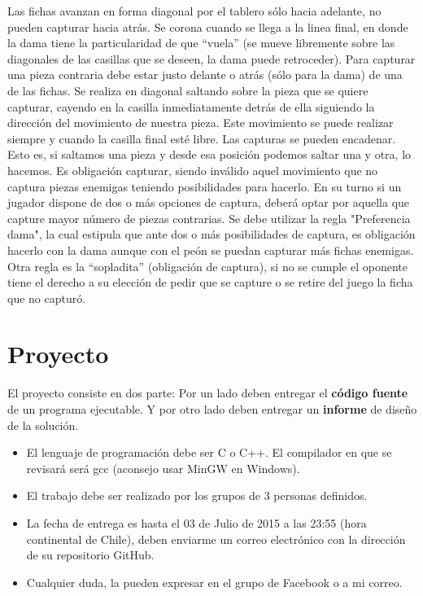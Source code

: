 \documentclass[a4paper,10pt]{article}
\begin{document}
Las fichas avanzan en forma diagonal por el tablero sólo hacia adelante, no pueden capturar hacia atrás. Se corona cuando se llega a la linea final, en donde  la dama tiene la particularidad de que ``vuela'' (se mueve libremente sobre las diagonales de las casillas que se deseen, la dama puede retroceder).
\newline
Para capturar una pieza contraria debe estar justo delante o atrás (sólo para la dama) de una de las fichas. Se realiza en diagonal saltando sobre la pieza que se quiere capturar, cayendo en la casilla inmediatamente detrás de ella siguiendo la dirección del movimiento de nuestra pieza. Este movimiento se puede realizar siempre y cuando la casilla final esté libre. Las capturas se pueden encadenar. Esto es, si saltamos una pieza y desde esa posición podemos saltar una y otra, lo hacemos. Es obligación capturar, siendo inválido aquel movimiento que no captura piezas enemigas teniendo posibilidades para hacerlo. En su turno si un jugador dispone de dos o más opciones de captura, deberá optar por aquella que capture mayor número de piezas contrarias.
\newline
Se debe utilizar la regla "Preferencia dama", la cual estipula que ante dos o más posibilidades de captura, es obligación hacerlo con la dama aunque con el peón se puedan capturar más fichas enemigas. 
\newline
Otra regla es la ``sopladita'' (obligación de captura), si no se cumple el oponente tiene el derecho a su elección de pedir que se capture o se retire del juego la ficha que no capturó.



\section{Proyecto}

El proyecto consiste en dos parte:
\newline
Por un lado deben entregar el {\bf código fuente} de un programa ejecutable. Y por otro lado deben entregar un {\bf informe} de diseño de la solución.


\begin{itemize}
 \item El lenguaje de programación debe ser C o C++. El compilador en que se revisará será gcc (aconsejo usar MinGW en Windows).
 \item El trabajo debe ser realizado por los grupos de 3 personas definidos.
 \item La fecha de entrega es hasta el 03 de Julio de 2015 a las 23:55 (hora continental de Chile), deben enviarme un correo electrónico con la dirección de su repositorio GitHub.
 \item Cualquier duda, la pueden expresar en el grupo de Facebook o a mi correo.
\end{itemize}
\end{document}
